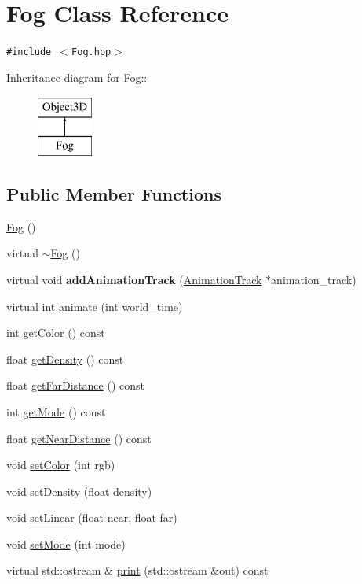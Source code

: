 \hypertarget{classm3g_1_1Fog}{
\section{Fog Class Reference}
\label{classm3g_1_1Fog}
}
{\tt \#include $<$Fog.hpp$>$}

Inheritance diagram for Fog::\begin{figure}[H]
\begin{center}
\leavevmode
\includegraphics[height=2cm]{classm3g_1_1Fog}
\end{center}
\end{figure}
\subsection*{Public Member Functions}
\begin{CompactItemize}
\item 
\hyperlink{classm3g_1_1Fog_232ea9c5f5824d924fa185401fbfb234}{Fog} ()
\item 
virtual \hyperlink{classm3g_1_1Fog_c13d77e65284ed8f7480c8f83ed9780f}{$\sim$Fog} ()
\item 
\hypertarget{classm3g_1_1Fog_415c0b110f95410ded9b85e5d99a496b}{
virtual void \textbf{addAnimationTrack} (\hyperlink{classm3g_1_1AnimationTrack}{AnimationTrack} $\ast$animation\_\-track)}
\label{classm3g_1_1Fog_415c0b110f95410ded9b85e5d99a496b}

\item 
virtual int \hyperlink{classm3g_1_1Fog_8aad1ceab4c2a03609c8a42324ce484d}{animate} (int world\_\-time)
\item 
int \hyperlink{classm3g_1_1Fog_4cfa1931c265ec3412fe3f6408a1b4f5}{getColor} () const 
\item 
float \hyperlink{classm3g_1_1Fog_31deef556a6aa5e519d3c79bd9c383c0}{getDensity} () const 
\item 
float \hyperlink{classm3g_1_1Fog_90df17252a921929fce6a5e92aed4021}{getFarDistance} () const 
\item 
int \hyperlink{classm3g_1_1Fog_d4ce4524e4751fe5e3cfb8c270347d54}{getMode} () const 
\item 
float \hyperlink{classm3g_1_1Fog_cd7a642e43bf99b0e1c5c24d3c6424a2}{getNearDistance} () const 
\item 
void \hyperlink{classm3g_1_1Fog_b1f5cc0f5cc6bbbd716a526c61f1081d}{setColor} (int rgb)
\item 
void \hyperlink{classm3g_1_1Fog_0ceeda25e326e99d6e971e980a00bd49}{setDensity} (float density)
\item 
void \hyperlink{classm3g_1_1Fog_a46fd556865ae7f1c683c3741b68c168}{setLinear} (float near, float far)
\item 
void \hyperlink{classm3g_1_1Fog_9f407b18ba6235cb96fa95611c1ea3a4}{setMode} (int mode)
\item 
virtual std::ostream \& \hyperlink{classm3g_1_1Fog_6fea17fa1532df3794f8cb39cb4f911f}{print} (std::ostream \&out) const 
\end{CompactItemize}
